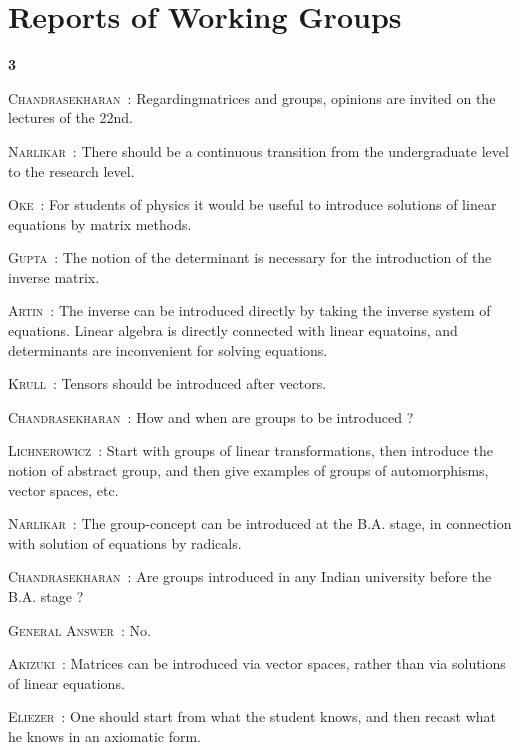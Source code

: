 \chapter{Reports of Working Groups}

\begin{center}
{\large\bf 3}
\end{center}
\medskip

\setcounter{pageoriginal}{180}
\noindent
\textsc{Chandrasekharan}~: Regarding\pageoriginale matrices and groups, opinions are invited on the lectures of the 22nd.

\smallskip
\noindent
\textsc{Narlikar}~: There should be a continuous transition from the undergraduate level to the research level.

\smallskip
\noindent
\textsc{Oke}~: For students of physics it would be useful to introduce solutions of linear equations by matrix methods.

\smallskip
\noindent
\textsc{Gupta}~: The notion of the determinant is necessary for the introduction of the inverse matrix.

\smallskip
\noindent
\textsc{Artin}~: The inverse can be introduced directly by taking the inverse system of equations. Linear algebra is directly connected with linear equatoins, and determinants are inconvenient for solving equations.

\smallskip
\noindent
\textsc{Krull}~: Tensors should be introduced after vectors.

\smallskip
\noindent
\textsc{Chandrasekharan}~: How and when are groups to be introduced ?

\smallskip
\noindent
\textsc{Lichnerowicz}~: Start with groups of linear transformations, then introduce the notion of abstract group, and then give examples of groups of automorphisms, vector spaces, etc.

\smallskip
\noindent
\textsc{Narlikar}~: The group-concept can be introduced at the B.A. stage, in connection with solution of equations by radicals.

\smallskip
\noindent
\textsc{Chandrasekharan}~: Are groups introduced in any Indian university before the B.A. stage ?

\smallskip
\noindent
\textsc{General Answer}~: No.

\smallskip
\noindent
\textsc{Akizuki}~: Matrices can be introduced via vector spaces, rather than via solutions of linear equations.

\smallskip
\noindent
\textsc{Eliezer}~: One should start from what the student knows, and then recast what he knows in an axiomatic form.

